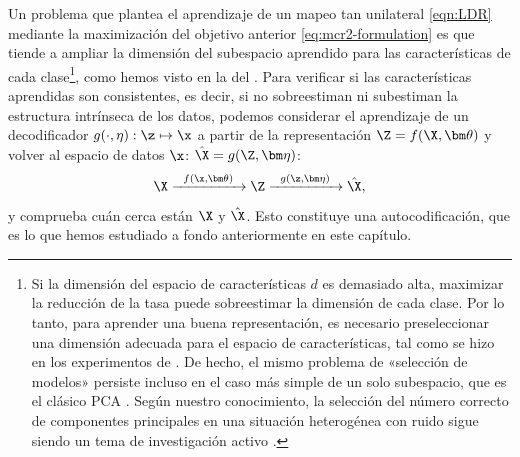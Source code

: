 \documentclass[../../book-main_es.tex]{subfiles}
\begin{document}
Un problema que plantea el aprendizaje de un mapeo tan unilateral \eqref{eqn:LDR} mediante
la maximización del objetivo anterior \eqref{eq:mcr2-formulation} es que
tiende a ampliar la dimensión del subespacio aprendido para las características de
cada clase\footnote{Si la dimensión del espacio de características $d$ es demasiado
    alta, maximizar la reducción de la tasa puede sobreestimar la dimensión
    de cada clase. Por lo tanto, para aprender una buena representación, es necesario
    preseleccionar una dimensión adecuada para el espacio de características, tal como se hizo en
    los experimentos de \cite{yu2020learning}. De hecho, el mismo problema de «selección de modelos»
    persiste incluso en el caso más simple de un solo subespacio,
    que es el clásico PCA \cite{Jolliffe1986}. Según nuestro
    conocimiento, la selección del número correcto de componentes principales en una
    situación heterogénea con ruido sigue siendo un tema de investigación activo
\cite{hong2020selecting}.}, como hemos visto en la
 del
. Para verificar si las características aprendidas son
consistentes, es decir, si no sobreestiman ni subestiman la
estructura intrínseca de los datos, podemos considerar el aprendizaje de un decodificador
$g(\cdot,\eta): \z \mapsto  \x$ a partir de la representación $\Z =
f(\X,\bm\theta)$ y volver al espacio de datos $\x$: $\hat \X = g(\Z, \bm\eta)$:
\begin{equation}
    \X \xrightarrow{\hspace{2mm} f(\x, \bm\theta)\hspace{2mm}} \Z
    \xrightarrow{\hspace{2mm} g(\z, \bm \eta) \hspace{2mm}} \hat \X,
    \label{eqn:autoencoding-ch6}
\end{equation}
y comprueba cuán cerca están $\X$ y $\hat \X$. Esto constituye una
autocodificación, que es lo que hemos estudiado a fondo anteriormente en este capítulo.
\end{document}
